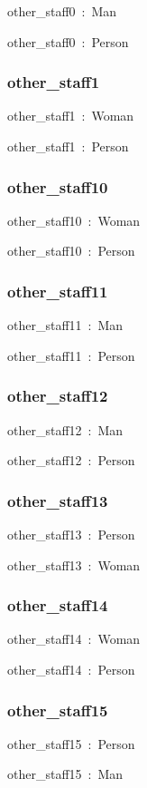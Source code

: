 \documentclass{article}
\begin{document}
other\_staff0~:~Man

other\_staff0~:~Person

\subsubsection*{other\_staff1}

other\_staff1~:~Woman

other\_staff1~:~Person

\subsubsection*{other\_staff10}

other\_staff10~:~Woman

other\_staff10~:~Person

\subsubsection*{other\_staff11}

other\_staff11~:~Man

other\_staff11~:~Person

\subsubsection*{other\_staff12}

other\_staff12~:~Man

other\_staff12~:~Person

\subsubsection*{other\_staff13}

other\_staff13~:~Person

other\_staff13~:~Woman

\subsubsection*{other\_staff14}

other\_staff14~:~Woman

other\_staff14~:~Person

\subsubsection*{other\_staff15}

other\_staff15~:~Person

other\_staff15~:~Man
\end{document}
